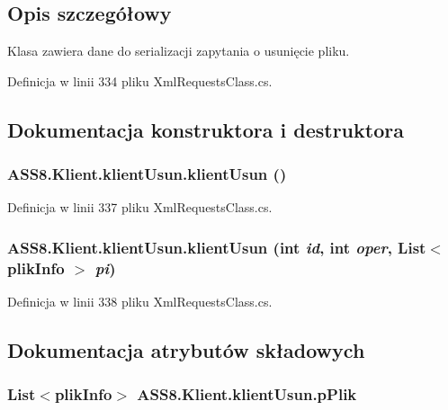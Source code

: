 \subsection{Opis szczegółowy}
Klasa zawiera dane do serializacji zapytania o usunięcie pliku. 



Definicja w linii 334 pliku XmlRequestsClass.cs.

\subsection{Dokumentacja konstruktora i destruktora}
\hypertarget{a00012_b199284c747db6951ae55f6276bb80f3}{
\subsubsection[{klientUsun}]{\setlength{\rightskip}{0pt plus 5cm}ASS8.Klient.klientUsun.klientUsun ()}}
\label{df/d86/a00012_b199284c747db6951ae55f6276bb80f3}




Definicja w linii 337 pliku XmlRequestsClass.cs.\hypertarget{a00012_deeafd41f76b7ec30ef021354ea80cb8}{
\subsubsection[{klientUsun}]{\setlength{\rightskip}{0pt plus 5cm}ASS8.Klient.klientUsun.klientUsun (int {\em id}, \/  int {\em oper}, \/  List$<$ {\bf plikInfo} $>$ {\em pi})}}
\label{df/d86/a00012_deeafd41f76b7ec30ef021354ea80cb8}




Definicja w linii 338 pliku XmlRequestsClass.cs.

\subsection{Dokumentacja atrybutów składowych}
\hypertarget{a00012_c82991917146a9f234484a6b3e5ad685}{
\subsubsection[{pPlik}]{\setlength{\rightskip}{0pt plus 5cm}List$<${\bf plikInfo}$>$ {\bf ASS8.Klient.klientUsun.pPlik}}}
\label{df/d86/a00012_c82991917146a9f234484a6b3e5ad685}




